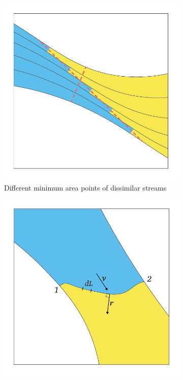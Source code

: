 \documentclass[a4paper, 11pt, oneside]{report}
\begin{document}
\begin{figure}[H]
	\centering
	\begin{subfigure}{.45\textwidth}
		\centering
		\includegraphics[width=\linewidth]{figs/illustration_of_minimum_area_ver04.png}
		\caption{Different minimum area points of dissimilar streams}
		\label{fig:illustration_of_minimum_area}
	\end{subfigure}
	\hspace{0.05\textwidth}
	\begin{subfigure}{.45\textwidth}
		\centering
		\includegraphics[width=\linewidth]{figs/illustration_of_equivalent_throat_area_integral_ver03.png}

\end{subfigure}
\end{figure}
\end{document}
